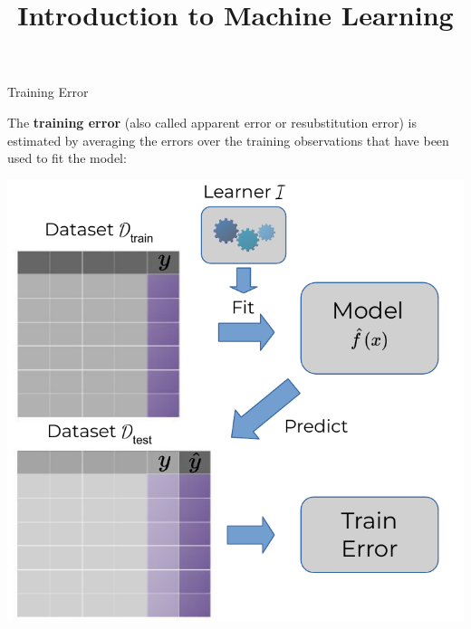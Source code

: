 \documentclass[11pt,compress,t,notes=noshow, xcolor=table]{beamer}
\title{Introduction to Machine Learning}
\institute{\href{https://compstat-lmu.github.io/lecture_i2ml/}{compstat-lmu.github.io/lecture\_i2ml}}
\date{}
\begin{document}







\begin{vbframe}{Training Error}

The \textbf{training error} (also called apparent error or resubstitution error)
is estimated by averaging the errors over the training observations that have 
been used to fit the model:

\vfill

\begin{center}
\includegraphics[width=.55\textwidth]{figure_man/train_error.pdf}
\end{center}

\end{vbframe}

\end{document}
